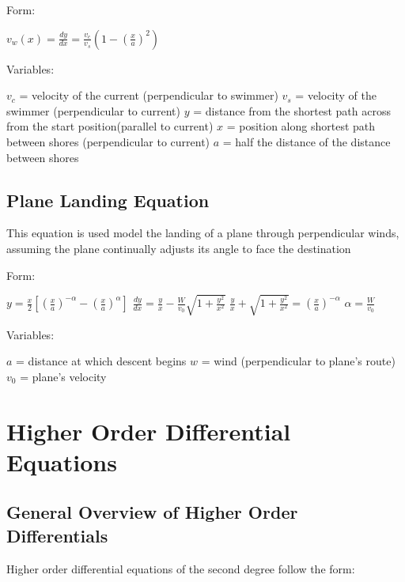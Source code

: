 \documentclass[12 pt, oneside]{book}
\begin{document}
Form:
\begin{mathline}
  $v_w(x)=\frac{dy}{dx}=\frac{v_c}{v_s}(1-(\frac{x}{a})^2)$
\end{mathline}

Variables:
\begin{mathline}
  $v_c$ = velocity of the current (perpendicular to swimmer)\newline{}
  $v_s$ = velocity of the swimmer (perpendicular to current)\newline{}
  $y$ = distance from the shortest path across from the start position(parallel to current)\newline{}
  $x$ = position along shortest path between shores (perpendicular to current)\newline{}
  $a$ = half the distance of the distance between shores
\end{mathline}

\section{Plane Landing Equation}
This equation is used model the landing of a plane through perpendicular winds, assuming the plane continually adjusts its angle to face the destination

Form:
\begin{mathline}
  $y=\frac{x}{2}[(\frac{x}{a})^{-\alpha}-(\frac{x}{a})^{\alpha}]$\newline{}
  $\frac{dy}{dx}=\frac{y}{x}-\frac{W}{v_0}\sqrt{1+\frac{y^2}{x^2}}$\newline{}
  $\frac{y}{x}+\sqrt{1+\frac{y^2}{x^2}}=(\frac{x}{a})^{-\alpha}$\newline{}
  $\alpha = \frac{W}{v_0}$
\end{mathline}

Variables:
\begin{mathline}
  $a$ = distance at which descent begins\newline{}
  $w$ = wind (perpendicular to plane's route)\newline{}
  $v_0$ = plane's velocity
\end{mathline}
  
\chapter{Higher Order Differential Equations}

\section{General Overview of Higher Order Differentials}
Higher order differential equations of the second degree follow the form:\newline{}
\end{document}
